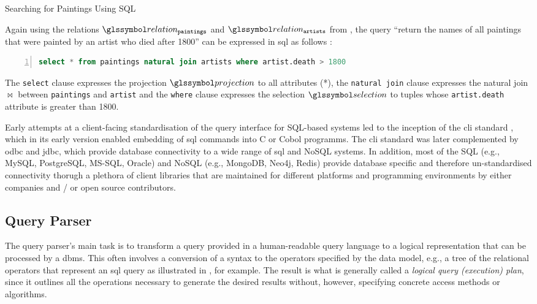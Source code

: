 \begin{example}[label=example:sql_query]{Searching for Paintings Using SQL}{}

    Again using the relations $\relation_{\mathtt{paintings}}$ and $\relation_{\mathtt{artists}}$ from , the query ``return the names of all paintings that were painted by an artist who died after 1800'' can be expressed in \acrshort{sql} as follows \cite{Graefe:1993Query}:

    \begin{lstlisting}[language=SQL, showspaces=false, basicstyle=\ttfamily, numbers=left, numberstyle=\tiny]
        select * from paintings natural join artists where artist.death > 1800
    \end{lstlisting}

    The \texttt{select} clause expresses the projection $\projection$ to all attributes (*), the \texttt{natural join} clause expresses the natural join $\Join$ between \texttt{paintings} and \texttt{artist} and the \texttt{where} clause expresses the selection $\selection$ to tuples whose \texttt{artist.death} attribute is greater than 1800.
\end{example}

Early attempts at a client-facing standardisation of the query interface for SQL-based systems led to the inception of the \acrfull{cli} standard \cite{XOpen:1995CLI}, which in its early version enabled embedding of \acrshort{sql} commands into C or Cobol programms. The \acrshort{cli} standard was later complemented by \acrfull{odbc} and \acrfull{jdbc}, which provide database connectivity to a wide range of \acrshort{sql} and NoSQL systems. In addition, most of the SQL (e.g., MySQL, PostgreSQL, MS-SQL, Oracle) and NoSQL (e.g., MongoDB, Neo4j, Redis) provide database specific and therefore un-standardised connectivity thorugh a plethora of client libraries that are maintained for different platforms and programming environments by either companies and / or open source contributors.

\subsection{Query Parser}

The query parser's main task is to transform a query provided in a human-readable query language to a logical representation that can be processed by a \acrshort{dbms}. This often involves a conversion of a syntax to the operators specified by the data model, e.g., a tree of the relational operators that represent an \acrshort{sql} query as illustrated in , for example. The result is what is generally called a \emph{logical query (execution) plan}, since it outlines all the operations necessary to generate the desired results without, however, specifying concrete access methods or algorithms.

